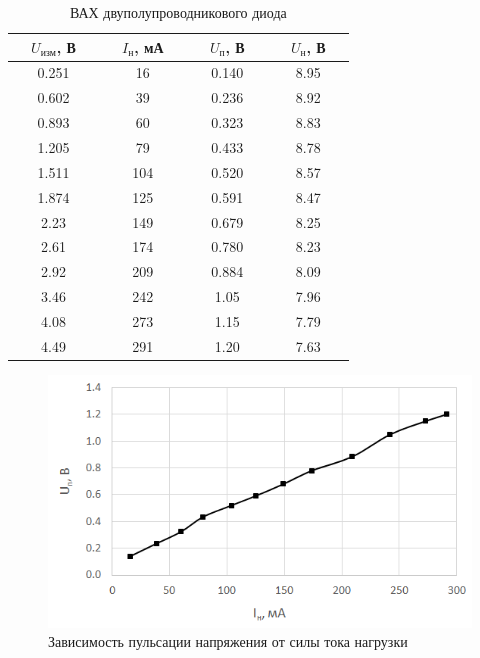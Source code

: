 \begin{table}[H]
	\begin{center}
	\caption{ВАХ двуполупроводникового диода}
	\def\arraystretch{1.5}
		\begin{tabular}{|c|c|c|c|}
		\hline 
		\ \ $U_\text{изм}$, В\ \  & \ \ $I_\text{н}$, мА\ \  & \ \ $U_\text{п}$, В\ \  & \ \ $U_\text{н}$, В\ \  \\ \hline
		0.251 & 16 & 0.140 & 8.95 \\ \hline
		0.602 & 39 & 0.236 & 8.92 \\ \hline
		0.893 & 60 & 0.323 & 8.83 \\ \hline
		1.205 & 79 & 0.433 & 8.78 \\ \hline
		1.511 & 104 & 0.520 & 8.57 \\ \hline
		1.874 & 125 & 0.591 & 8.47 \\ \hline
		2.23 & 149 & 0.679 & 8.25 \\ \hline
		2.61 & 174 & 0.780 & 8.23 \\ \hline
		2.92 & 209 & 0.884 & 8.09 \\ \hline
		3.46 & 242 & 1.05 & 7.96 \\ \hline
		4.08 & 273 & 1.15 & 7.79 \\ \hline
		4.49 & 291 & 1.20 & 7.63 \\ \hline
		\end{tabular} 
		\label{tab:5:1}
	\end{center}
\end{table}

\begin{figure}[H]
	\begin{center}
		\includegraphics[width=14cm]{img/4}
		\caption{Зависимость пульсации напряжения от силы тока нагрузки}
		\label{g:2} %
	\end{center}
\end{figure}

